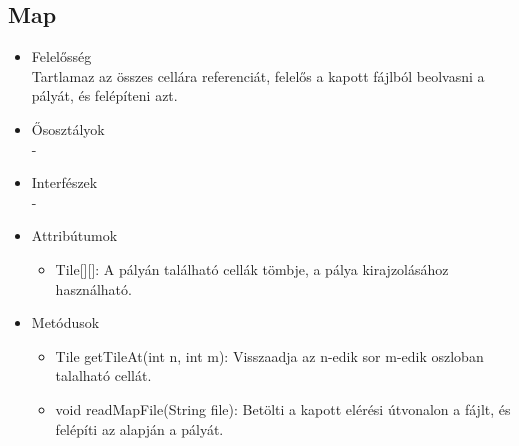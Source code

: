 \subsection{Map}
\begin{itemize}
\item Felelősség\\
Tartlamaz az összes cellára referenciát, felelős a kapott fájlból beolvasni a pályát, és felépíteni azt.
\item Ősosztályok\\
-
\item Interfészek\\
-
\item Attribútumok\\
	\begin{itemize}
		\item Tile[][]: A pályán található cellák tömbje, a pálya kirajzolásához használható.
	\end{itemize}
\item Metódusok\\
	\begin{itemize}
		\item Tile getTileAt(int n, int m): Visszaadja az n-edik sor m-edik oszloban talalható cellát.
		\item void readMapFile(String file): Betölti a kapott elérési útvonalon a fájlt, és felépíti az alapján a pályát.
	\end{itemize}
\end{itemize}


